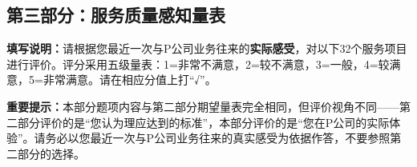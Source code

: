 \newpage

\subsection*{第三部分：服务质量感知量表}

\textbf{填写说明：}请根据您最近一次与P公司业务往来的\textbf{实际感受}，对以下32个服务项目进行评价。评分采用五级量表：1=非常不满意，2=较不满意，3=一般，4=较满意，5=非常满意。请在相应分值上打“√”。

\vspace{1em}

\textbf{重要提示：}本部分题项内容与第二部分期望量表完全相同，但评价视角不同——第二部分评价的是“您认为理应达到的标准”，本部分评价的是“您在P公司的实际体验”。请务必以您最近一次与P公司业务往来的真实感受为依据作答，不要参照第二部分的选择。

\vspace{1em}

